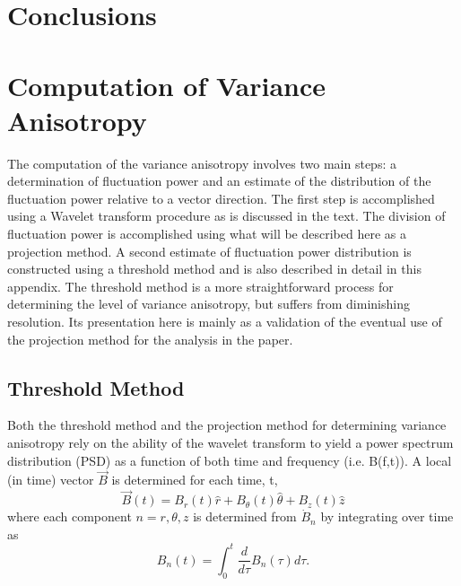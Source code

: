 \documentclass[aip,prl,amsmath,amssymb,reprint,superscriptaddress]{revtex4-1} %
\begin{document}
\section{Conclusions}



\appendix

\section{Computation of Variance Anisotropy}

The computation of the variance anisotropy involves two main steps: a determination of fluctuation power and an estimate of the distribution of the fluctuation power relative to a vector direction. The first step is accomplished using a Wavelet transform procedure as is discussed in the text. The division of fluctuation power is accomplished using what will be described here as a projection method. A second estimate of fluctuation power distribution is constructed using a threshold method and is also described in detail in this appendix. The threshold method is a more straightforward process for determining the level of variance anisotropy, but suffers from diminishing resolution. Its presentation here is mainly as a validation of the eventual use of the projection method for the analysis in the paper. 

\subsection{Threshold Method}

Both the threshold method and the projection method for determining variance anisotropy rely on the ability of the wavelet transform to yield a power spectrum distribution (PSD) as a function of both time and frequency (i.e. B(f,t)). A local (in time) vector $\vec{B}$ is determined for each time, t,
\begin{equation}
\vec{B}(t) = B_{r}(t)\hat{r} + B_{\theta}(t)\hat{\theta} + B_{z}(t)\hat{z}
\label{eq:Bvector}
\end{equation}
where each component $n=r,\theta,z$ is determined from $\dot{B}_{n}$ by integrating over time as
\begin{equation}
B_{n}(t) = \int_{0}^{t} \frac{d}{d\tau}B_{n}(\tau)d\tau.
\label{eq:Bintegrated}
\end{equation}
\end{document}
